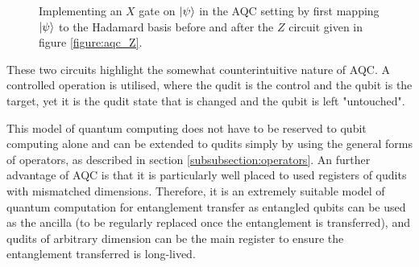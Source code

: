 \begin{figure}[h]
    \begin{center}
    \caption{Implementing an $X$ gate on $\ket{\psi}$ in the AQC setting by first mapping $\ket{\psi}$ to the Hadamard basis before and after the $Z$ circuit given in figure \ref{figure:aqc_Z}.}
    \label{figure:aqc_X}
    \end{center}
\end{figure}
These two circuits highlight the somewhat counterintuitive nature of AQC.
A controlled operation is utilised, where the qudit is the control and the qubit is the target, yet it is the qudit state that is changed and the qubit is left "untouched".

This model of quantum computing does not have to be reserved to qubit computing alone and can be extended to qudits simply by using the general forms of operators, as described in section \ref{subsubsection:operators}.
An further advantage of AQC is that it is particularly well placed to used registers of qudits with mismatched dimensions.
Therefore, it is an extremely suitable model of quantum computation for entanglement transfer as entangled qubits can be used as the ancilla (to be regularly replaced once the entanglement is transferred), and qudits of arbitrary dimension can be the main register to ensure the entanglement transferred is long-lived.